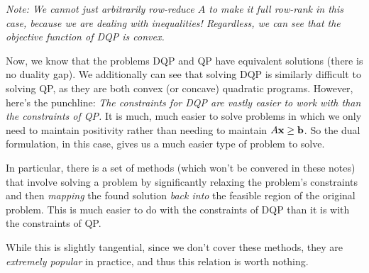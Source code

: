 \textit{Note: We cannot just arbitrarily row-reduce $A$ to make it full row-rank in
this case, because we are dealing with inequalities! Regardless, we can see
that the objective function of DQP is convex.}

Now, we know that the problems DQP and QP have equivalent solutions (there is
no duality gap). We additionally can see that solving DQP is similarly 
difficult to solving QP, as they are both convex (or concave) quadratic programs.
However, here's the punchline: \textit{The constraints for DQP are vastly easier to
work with than the constraints of QP.} It is much, much easier to solve problems
in which we only need to maintain positivity rather than needing to maintain 
$A\mathbf{x} \geq \mathbf{b}$. So the dual formulation, in this case, gives us a much easier
type of problem to solve. 

In particular, there is a set of methods (which won't be convered in these notes) 
that involve solving
a problem by significantly relaxing the problem's constraints and then \textit{mapping}
the found solution \textit{back into} the feasible region of the original problem. 
This is much easier to do with the constraints of DQP than it is with the constraints of QP.

While this is slightly tangential, since we don't cover these methods, they are 
\textit{extremely popular} in 
practice, and thus this relation is worth nothing.


